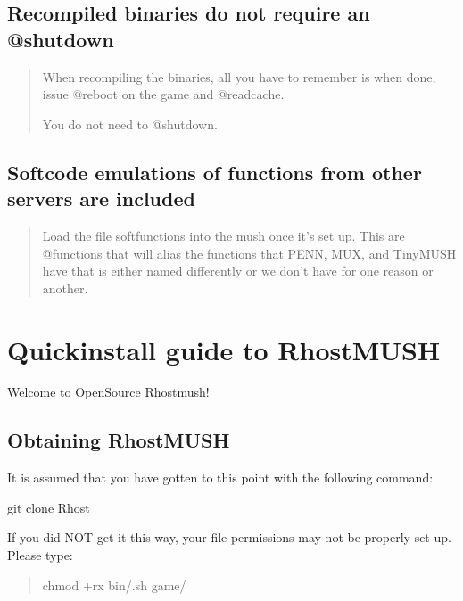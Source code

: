 \documentclass[letterpaper,10pt,english]{sphinxmanual}
\begin{document}
\section{Re\sphinxhyphen{}compiled binaries do not require an @shutdown}
\label{\detokenize{23-random:re-compiled-binaries-do-not-require-an-shutdown}}\begin{quote}

\sphinxAtStartPar
When re\sphinxhyphen{}compiling the binaries, all you have to remember is when done, issue
@reboot on the game and @readcache.

\sphinxAtStartPar
You do not need to @shutdown.
\end{quote}


\section{Softcode emulations of functions from other servers are included}
\label{\detokenize{23-random:softcode-emulations-of-functions-from-other-servers-are-included}}\begin{quote}

\sphinxAtStartPar
Load the file softfunctions into the mush once it’s set up.  This are
@functions that will alias the functions that PENN, MUX, and TinyMUSH have
that is either named differently or we don’t have for one reason or another.
\end{quote}


\chapter{Quickinstall guide to RhostMUSH}
\label{\detokenize{24-quickinstall:quickinstall-guide-to-rhostmush}}\label{\detokenize{24-quickinstall::doc}}
\sphinxAtStartPar
Welcome to OpenSource Rhostmush!


\section{Obtaining RhostMUSH}
\label{\detokenize{24-quickinstall:obtaining-rhostmush}}
\sphinxAtStartPar
It is assumed that you have gotten to this point with the following command:

\sphinxAtStartPar
git clone  Rhost

\sphinxAtStartPar
If you did NOT get it this way, your file permissions may not be properly set
up.  Please type:
\begin{quote}

\sphinxAtStartPar
chmod +rx bin/.sh game/
\end{quote}
\end{document}
